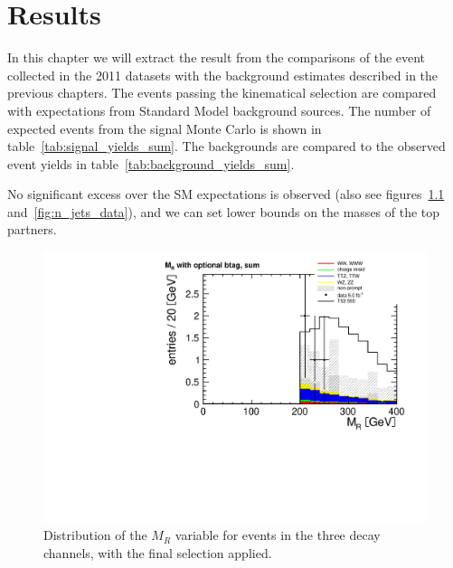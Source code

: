 \chapter{Results}
In this chapter we will extract the result from the comparisons of the event collected in the 2011 datasets with the
background estimates described in the previous chapters.
The events passing the kinematical selection are compared with expectations
from Standard Model background sources. The number of expected events from
the signal Monte Carlo is shown in table~\ref{tab:signal_yields_sum}. The
backgrounds are compared to the observed event yields in
table~\ref{tab:background_yields_sum}.


No significant excess over the SM expectations is observed (also see
figures~\ref{fig:mr_data} and~\ref{fig:n_jets_data}), and we can set
lower bounds on the masses of the top partners.

\begin{figure}[htb]
    \centering
    \includegraphics[width=\textwidth]{images/pdf/4jets_AND_mr200_AND_r02_AND_had_mass350/mr_optional_btag_sum_1}
    \caption{Distribution of the $M_R$ variable for events in the three decay
        channels, with the final
        selection applied.}
    \label{fig:mr_data}
\end{figure}

